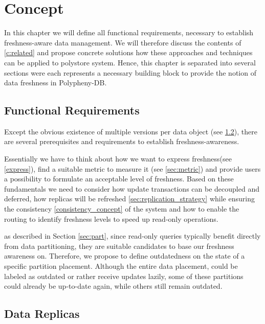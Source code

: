 \chapter{Concept}
\label{c:concept}


In this chapter we will define all functional requirements, necessary to establish freshness-aware data management.
We will therefore discuss the contents of \ref{c:related} and propose concrete solutions how these approaches and techniques can be applied to polystore system.
Hence, this chapter is separated into several sections were each represents a necessary building block to provide the notion of data freshness in Polypheny-DB.


\section{Functional Requirements}
Except the obvious existence of multiple versions per data object (see \ref{sec:data_replicas}), there are several prerequisites and requirements to establish freshness-awareness. 

Essentially we have to think about how we want to express freshness(see \ref{express}), find a suitable metric to measure it (see \ref{sec:metric})
and provide users a possibility to formulate an acceptable level of freshness. Based on these fundamentals we need to consider how update transactions 
can be decoupled and deferred, how replicas will
be refreshed \ref{sec:replication_strategy} while ensuring the consistency \ref{consistency_concept} of the system and how to enable the routing to identify freshness levels to speed up read-only operations. 


as described in Section \ref{sec:part}, since read-only queries typically benefit directly from data partitioning, they are suitable candidates to base our freshness awareness on.
Therefore, we propose to define outdatedness on the state of a specific partition placement.
Although the entire data placement, could be labeled as outdated or rather receive updates lazily, some of 
these partitions could already be up-to-date again, while others still remain outdated.




\section{Data Replicas}
\label{sec:data_replicas}

